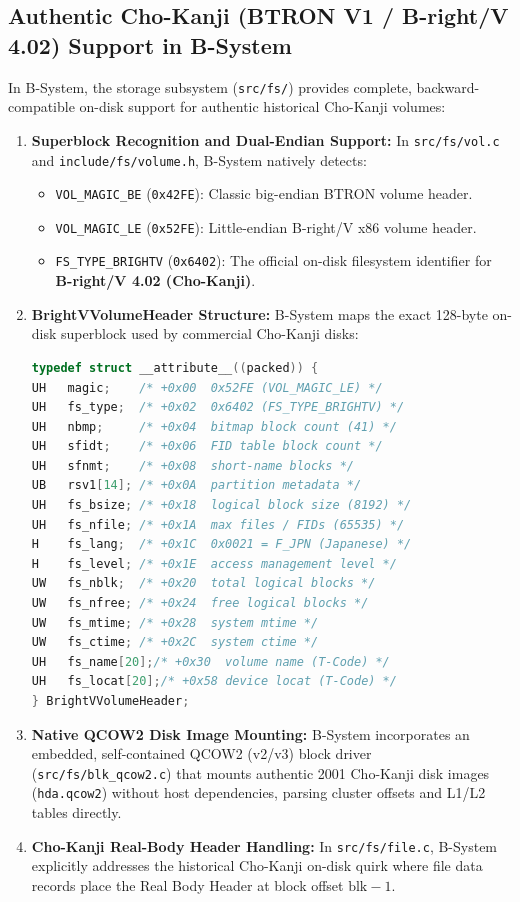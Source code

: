\documentclass[10pt,journal,compsoc,twocolumn]{article}
\begin{document}
\subsection{Authentic Cho-Kanji (BTRON V1 / B-right/V 4.02) Support in B-System}
In B-System, the storage subsystem (\texttt{src/fs/}) provides complete, backward-compatible on-disk support for authentic historical Cho-Kanji volumes:
\begin{enumerate}[leftmargin=*]
    \item \textbf{Superblock Recognition and Dual-Endian Support:} In \texttt{src/fs/vol.c} and \texttt{include/fs/volume.h}, B-System natively detects:
    \begin{itemize}
        \item \texttt{VOL\_MAGIC\_BE} (\texttt{0x42FE}): Classic big-endian BTRON volume header.
        \item \texttt{VOL\_MAGIC\_LE} (\texttt{0x52FE}): Little-endian B-right/V x86 volume header.
        \item \texttt{FS\_TYPE\_BRIGHTV} (\texttt{0x6402}): The official on-disk filesystem identifier for \textbf{B-right/V 4.02 (Cho-Kanji)}.
    \end{itemize}
    \item \textbf{BrightVVolumeHeader Structure:} B-System maps the exact 128-byte on-disk superblock used by commercial Cho-Kanji disks:
    \begin{lstlisting}[language=C]
typedef struct __attribute__((packed)) {
UH   magic;    /* +0x00  0x52FE (VOL_MAGIC_LE) */
UH   fs_type;  /* +0x02  0x6402 (FS_TYPE_BRIGHTV) */
UH   nbmp;     /* +0x04  bitmap block count (41) */
UH   sfidt;    /* +0x06  FID table block count */
UH   sfnmt;    /* +0x08  short-name blocks */
UB   rsv1[14]; /* +0x0A  partition metadata */
UH   fs_bsize; /* +0x18  logical block size (8192) */
UH   fs_nfile; /* +0x1A  max files / FIDs (65535) */
H    fs_lang;  /* +0x1C  0x0021 = F_JPN (Japanese) */
H    fs_level; /* +0x1E  access management level */
UW   fs_nblk;  /* +0x20  total logical blocks */
UW   fs_nfree; /* +0x24  free logical blocks */
UW   fs_mtime; /* +0x28  system mtime */
UW   fs_ctime; /* +0x2C  system ctime */
UH   fs_name[20];/* +0x30  volume name (T-Code) */
UH   fs_locat[20];/* +0x58 device locat (T-Code) */
} BrightVVolumeHeader;
    \end{lstlisting}
    \item \textbf{Native QCOW2 Disk Image Mounting:} B-System incorporates an embedded, self-contained QCOW2 (v2/v3) block driver (\texttt{src/fs/blk\_qcow2.c}) that mounts authentic 2001 Cho-Kanji disk images (\texttt{hda.qcow2}) without host dependencies, parsing cluster offsets and L1/L2 tables directly.
    \item \textbf{Cho-Kanji Real-Body Header Handling:} In \texttt{src/fs/file.c}, B-System explicitly addresses the historical Cho-Kanji on-disk quirk where file data records place the Real Body Header at block offset $\text{blk} - 1$.
\end{enumerate}
\end{document}

